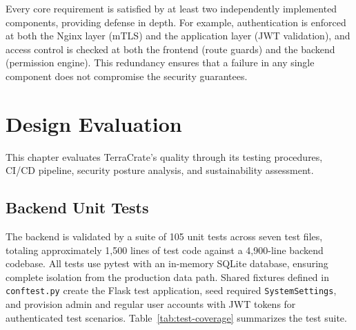 \documentclass[12pt,letterpaper]{report}
\begin{document}
Every core requirement is satisfied by at least two independently implemented components, providing defense in depth. For example, authentication is enforced at both the Nginx layer (mTLS) and the application layer (JWT validation), and access control is checked at both the frontend (route guards) and the backend (permission engine). This redundancy ensures that a failure in any single component does not compromise the security guarantees.

\chapter{Design Evaluation}

This chapter evaluates TerraCrate's quality through its testing procedures, CI/CD pipeline, security posture analysis, and sustainability assessment.

\section{Backend Unit Tests}

The backend is validated by a suite of 105 unit tests across seven test files, totaling approximately 1{,}500 lines of test code against a 4{,}900-line backend codebase. All tests use pytest with an in-memory SQLite database, ensuring complete isolation from the production data path. Shared fixtures defined in \texttt{conftest.py} create the Flask test application, seed required \texttt{SystemSettings}, and provision admin and regular user accounts with JWT tokens for authenticated test scenarios. Table~\ref{tab:test-coverage} summarizes the test suite.
\end{document}
